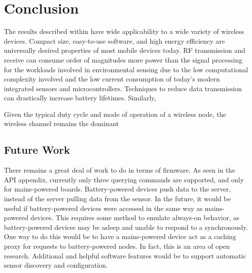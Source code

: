 \chapter{Conclusion}

The results described within have wide applicability to a wide variety of wireless devices. Compact size, easy-to-use software, and high energy efficiency are universally desired properties of most mobile devices today. RF transmission and receive can consume order of magnitudes more power than the signal processing for the workloads involved in environmental sensing due to the low computational complexity involved and the low current consumption of today's modern integrated sensors and microcontrollers. Techniques to reduce data transmission can drastically increase battery lifetimes. Similarly, 

Given the typical duty cycle and mode of operation of a wireless node, the wireless channel remains the dominant 

\section{Future Work}

There remains a great deal of work to do in terms of firmware. As seen in the API appendix, currently only three querying commands are supported, and only for mains-powered boards. Battery-powered devices push data to the server, instead of the server pulling data from the sensor. In the future, it would be useful if battery-powered devices were accessed in the same way as mains-powered devices. This requires some method to emulate always-on behavior, as battery-powered devices may be asleep and unable to respond to a synchronously. One way to do this would be to have a mains-powered device act as a caching proxy for requests to battery-powered nodes. In fact, this is an area of open research\cite{lu2011application}. Additional and helpful software features would be to support automatic sensor discovery and configuration.